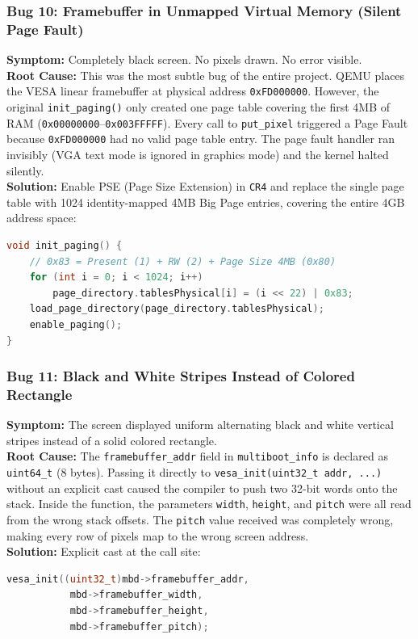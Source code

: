 \documentclass[12pt,a4paper]{report}
\begin{document}
\subsubsection*{Bug 10: Framebuffer in Unmapped Virtual Memory (Silent Page Fault)}
\textbf{Symptom:} Completely black screen. No pixels drawn. No error visible.\\
\textbf{Root Cause:} This was the most subtle bug of the entire project. QEMU places the VESA linear framebuffer at physical address \texttt{0xFD000000}. However, the original \texttt{init\_paging()} only created one page table covering the first 4MB of RAM (\texttt{0x00000000}--\texttt{0x003FFFFF}). Every call to \texttt{put\_pixel} triggered a Page Fault because \texttt{0xFD000000} had no valid page table entry. The page fault handler ran invisibly (VGA text mode is ignored in graphics mode) and the kernel halted silently.\\
\textbf{Solution:} Enable PSE (Page Size Extension) in \texttt{CR4} and replace the single page table with 1024 identity-mapped 4MB Big Page entries, covering the entire 4GB address space:
\begin{lstlisting}[language=C++]
void init_paging() {
    // 0x83 = Present (1) + RW (2) + Page Size 4MB (0x80)
    for (int i = 0; i < 1024; i++)
        page_directory.tablesPhysical[i] = (i << 22) | 0x83;
    load_page_directory(page_directory.tablesPhysical);
    enable_paging();
}
\end{lstlisting}

\subsubsection*{Bug 11: Black and White Stripes Instead of Colored Rectangle}
\textbf{Symptom:} The screen displayed uniform alternating black and white vertical stripes instead of a solid colored rectangle.\\
\textbf{Root Cause:} The \texttt{framebuffer\_addr} field in \texttt{multiboot\_info} is declared as \texttt{uint64\_t} (8 bytes). Passing it directly to \texttt{vesa\_init(uint32\_t addr, ...)} without an explicit cast caused the compiler to push two 32-bit words onto the stack. Inside the function, the parameters \texttt{width}, \texttt{height}, and \texttt{pitch} were all read from the wrong stack offsets. The \texttt{pitch} value received was completely wrong, making every row of pixels map to the wrong screen address.\\
\textbf{Solution:} Explicit cast at the call site:
\begin{lstlisting}[language=C++]
vesa_init((uint32_t)mbd->framebuffer_addr,
           mbd->framebuffer_width,
           mbd->framebuffer_height,
           mbd->framebuffer_pitch);
\end{lstlisting}
\end{document}

